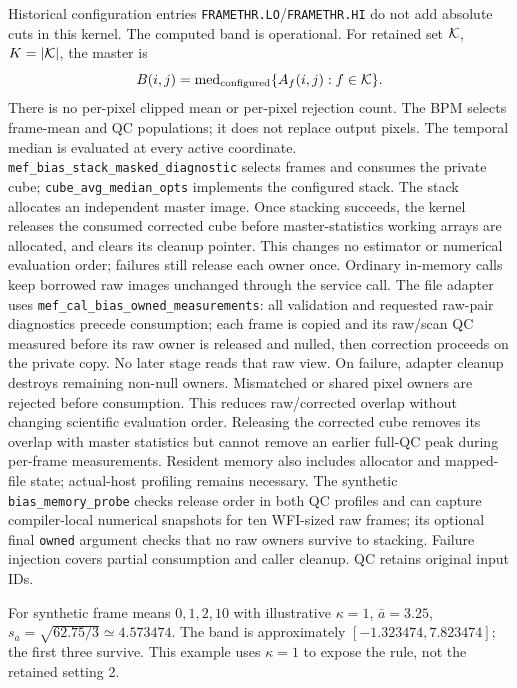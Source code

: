 \documentclass[11pt,a4paper]{article}
\newcommand{\code}[1]{\nolinkurl{#1}}
\begin{document}
Historical configuration entries \code{FRAMETHR.LO}/\code{FRAMETHR.HI}
do not add absolute cuts in this kernel. The computed band is operational.
For retained set ${\cal K}$, $K=|{\cal K}|$, the master is
\begin{equation}
 B(i,j)=\operatorname{med}_{\rm configured}
             \{A_f(i,j):f\in{\cal K}\}. \label{eq:stack}
\end{equation}
There is no per-pixel clipped mean or per-pixel rejection count.
The BPM selects frame-mean and QC populations; it does not replace output
pixels. The temporal median is evaluated at every active coordinate.
\code{mef_bias_stack_masked_diagnostic} selects frames and consumes the private
cube; \code{cube_avg_median_opts} implements the configured stack.
The stack allocates an independent master image. Once stacking succeeds, the
kernel releases the consumed corrected cube before master-statistics working
arrays are allocated, and clears its cleanup pointer. This changes no
estimator or numerical evaluation order; failures still release each owner
once. Ordinary in-memory calls keep borrowed raw images unchanged through the
service call. The file adapter uses \code{mef_cal_bias_owned_measurements}:
all validation and requested raw-pair diagnostics precede consumption; each
frame is copied and its raw/scan QC measured before its raw owner is released
and nulled, then correction proceeds on the private copy. No later stage reads
that raw view. On failure, adapter cleanup destroys remaining non-null owners.
Mismatched or shared pixel owners are rejected before consumption. This
reduces raw/corrected overlap without changing scientific evaluation order.
Releasing the corrected cube removes its overlap with master
statistics but cannot remove an earlier full-QC peak during per-frame
measurements. Resident memory also includes allocator and mapped-file state;
actual-host profiling remains necessary. The synthetic
\code{bias_memory_probe} checks release order in both QC profiles and can
capture compiler-local numerical snapshots for ten WFI-sized raw frames;
its optional final \code{owned} argument checks that no raw owners survive
to stacking. Failure injection covers partial consumption and caller cleanup.
QC retains original input IDs.

For synthetic frame means $0,1,2,10$ with illustrative $\kappa=1$,
$\bar a=3.25$, $s_a=\sqrt{62.75/3}\simeq4.573474$. The band is approximately
$[-1.323474,7.823474]$; the first three survive. This example uses $\kappa=1$
to expose the rule, not the retained setting 2.
\end{document}
